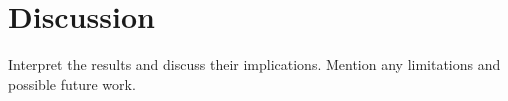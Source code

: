 \section{Discussion}
Interpret the results and discuss their implications. Mention any limitations and possible future work.
